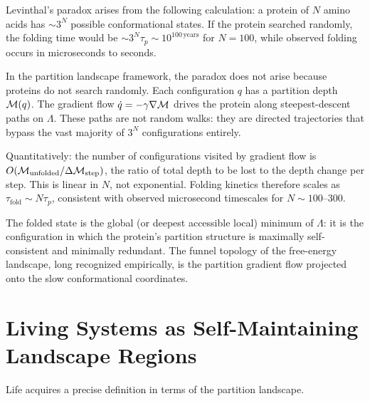 \begin{example}
\label{ex:levinthal}
Levinthal's paradox arises from the following calculation: a protein of $N$
amino acids has $\sim 3^N$ possible conformational states. If the protein
searched randomly, the folding time would be $\sim 3^N \tau_p \sim 10^{100\,\text{years}}$
for $N = 100$, while observed folding occurs in microseconds to seconds.

In the partition landscape framework, the paradox does not arise because
proteins do not search randomly. Each configuration $q$ has a partition depth
$\mathcal{M}(q)$. The gradient flow $\dot{q} = -\gamma\nabla\mathcal{M}$ drives the
protein along steepest-descent paths on $\Lambda$. These paths are not
random walks: they are directed trajectories that bypass the vast majority of
$3^N$ configurations entirely.

Quantitatively: the number of configurations visited by gradient flow is
$O(\mathcal{M}_{\mathrm{unfolded}} / \Delta\mathcal{M}_{\mathrm{step}})$, the ratio
of total depth to be lost to the depth change per step. This is linear in $N$,
not exponential. Folding kinetics therefore scales as $\tau_{\mathrm{fold}} \sim N \tau_p$,
consistent with observed microsecond timescales for $N \sim 100$--$300$.

The folded state is the global (or deepest accessible local) minimum of
$\Lambda$: it is the configuration in which the protein's partition structure
is maximally self-consistent and minimally redundant. The funnel topology
of the free-energy landscape, long recognized empirically, is the partition
gradient flow projected onto the slow conformational coordinates.
\end{example}

\section{Living Systems as Self-Maintaining Landscape Regions}
\label{sec:living_systems_landscape}

Life acquires a precise definition in terms of the partition landscape.


